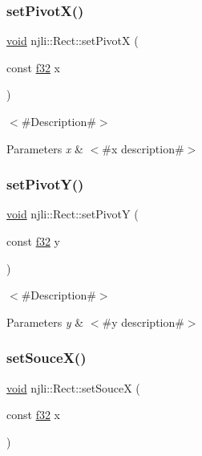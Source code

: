 \subsubsection{\texorpdfstring{set\+Pivot\+X()}{setPivotX()}}
{\footnotesize\ttfamily \mbox{\hyperlink{_thread_8h_af1e856da2e658414cb2456cb6f7ebc66}{void}} njli\+::\+Rect\+::set\+PivotX (\begin{DoxyParamCaption}\item[{const \mbox{\hyperlink{_util_8h_a5f6906312a689f27d70e9d086649d3fd}{f32}}}]{x }\end{DoxyParamCaption})}

$<$\#\+Description\#$>$


\begin{DoxyParams}{Parameters}
{\em x} & $<$\#x description\#$>$ \\
\hline
\end{DoxyParams}
\mbox{\label{classnjli_1_1_rect_ab371a8d3282ff9de7237f49ec23e77d3}} 
\subsubsection{\texorpdfstring{set\+Pivot\+Y()}{setPivotY()}}
{\footnotesize\ttfamily \mbox{\hyperlink{_thread_8h_af1e856da2e658414cb2456cb6f7ebc66}{void}} njli\+::\+Rect\+::set\+PivotY (\begin{DoxyParamCaption}\item[{const \mbox{\hyperlink{_util_8h_a5f6906312a689f27d70e9d086649d3fd}{f32}}}]{y }\end{DoxyParamCaption})}

$<$\#\+Description\#$>$


\begin{DoxyParams}{Parameters}
{\em y} & $<$\#y description\#$>$ \\
\hline
\end{DoxyParams}
\mbox{\label{classnjli_1_1_rect_af5b5c10f47874e5b82c55d81a094a881}} 
\subsubsection{\texorpdfstring{set\+Souce\+X()}{setSouceX()}}
{\footnotesize\ttfamily \mbox{\hyperlink{_thread_8h_af1e856da2e658414cb2456cb6f7ebc66}{void}} njli\+::\+Rect\+::set\+SouceX (\begin{DoxyParamCaption}\item[{const \mbox{\hyperlink{_util_8h_a5f6906312a689f27d70e9d086649d3fd}{f32}}}]{x }\end{DoxyParamCaption})}

